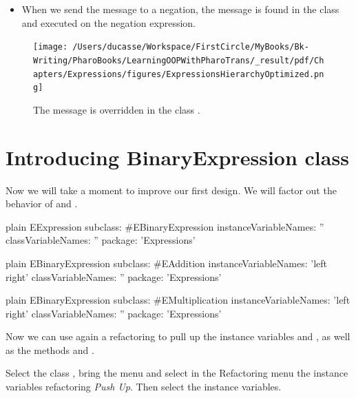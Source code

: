 \documentclass[10pt,twoside,english]{_support/latex/sbabook/sbabook}
\begin{document}
\begin{itemize}
\item When we send the message  to a negation, the message is found in the class  and executed on the negation expression. 
\end{itemize}


\begin{figure}

\begin{center}
\texttt{[image: /Users/ducasse/Workspace/FirstCircle/MyBooks/Bk-Writing/PharoBooks/LearningOOPWithPharoTrans/\_result/pdf/Chapters/Expressions/figures/ExpressionsHierarchyOptimized.png]}\caption{The message  is overridden in the class .\label{fig:ExpressionsHierarchyOptimized}}\end{center}
\end{figure}

\section{Introducing BinaryExpression class}\label{secBinaryExpression}
Now we will take a moment to improve our first design. We will factor out the behavior of  and . 

\begin{displaycode}{plain}
EExpression subclass: #EBinaryExpression
	instanceVariableNames: ''
	classVariableNames: ''
	package: 'Expressions'
\end{displaycode}

\begin{displaycode}{plain}
EBinaryExpression subclass: #EAddition
	instanceVariableNames: 'left right'
	classVariableNames: ''
	package: 'Expressions'
\end{displaycode}

\begin{displaycode}{plain}
EBinaryExpression subclass: #EMultiplication
	instanceVariableNames: 'left right'
	classVariableNames: ''
	package: 'Expressions'
\end{displaycode}

Now we can use again a refactoring to pull up the instance variables  and , as well as the methods  and .

Select the class , bring the menu and select in the Refactoring menu the instance variables refactoring \textit{Push Up}. Then select the instance variables.
\end{document}
